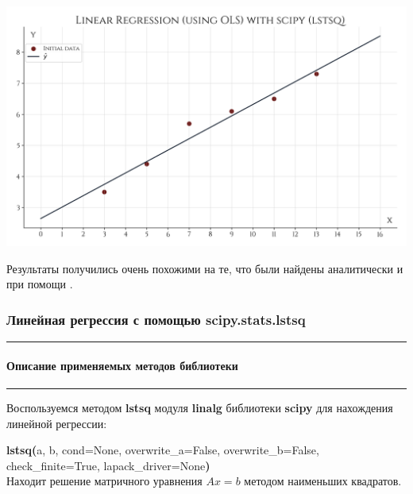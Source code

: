\documentclass[a4paper, 14pt]{extarticle}
\begin{document}
\begin{center}
    \includegraphics[width=1\textwidth, height=1\textheight, keepaspectratio]{Linear_Regression_scipy_lstsq} \\
\end{center}

Результаты получились очень похожими на те, что были найдены аналитически и при помощи .

\subsubsection*{{Линейная регрессия с помощью scipy.stats.lstsq}}\vspace{-20pt}\rule{\linewidth}{0.1mm}
\vspace{-30pt}\paragraph*{{Описание применяемых методов библиотеки}}\vspace{-20pt}\rule{\linewidth}{0.1mm}

Воспользуемся методом \textbf{lstsq} модуля \textbf{linalg} библиотеки \textbf{scipy} для 
нахождения линейной регрессии:

\begin{tcolorbox}[colback=mygray, boxrule=0pt, arc=0pt]
    \textbf{lstsq(}a, b, cond=None, overwrite\_a=False, overwrite\_b=False, check\_finite=True, 
    lapack\_driver=None\textbf{)} \\
    Находит решение матричного уравнения $Ax = b$ методом наименьших квадратов.
\end{tcolorbox}
\end{document}
